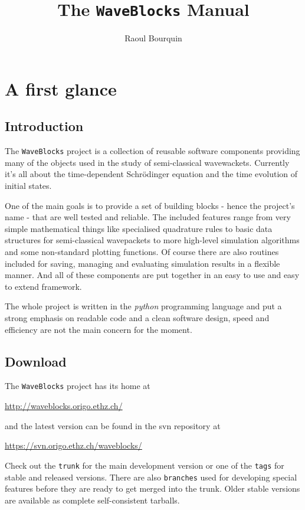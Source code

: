 \documentclass[a4paper,10pt]{report}
\title{The \texttt{WaveBlocks} Manual}
\author{Raoul Bourquin}
\begin{document}
\maketitle


\tableofcontents

\chapter{A first glance}

\section{Introduction}

The \texttt{WaveBlocks} project is a collection of reusable software components
providing many of the objects used in the study of semi-classical wavewackets.
Currently it's all about the time-dependent Schrödinger equation and the time
evolution of initial states.

One of the main goals is to provide a set of building blocks - hence the project's
name - that are well tested and reliable. The included features range from very
simple mathematical things like specialised quadrature rules to basic data
structures for semi-classical wavepackets to more high-level simulation algorithms
and some non-standard plotting functions. Of course there are also routines
included for saving, managing and evaluating simulation results in a flexible
manner. And all of these components are put together in an easy to use and easy
to extend framework.

The whole project is written in the \emph{python} programming language and put
a strong emphasis on readable code and a clean software design, speed and
efficiency are not the main concern for the moment.

\section{Download}

The \texttt{WaveBlocks} project has its home at
\begin{center}
  \url{http://waveblocks.origo.ethz.ch/}
\end{center}
and the latest version can be found in the svn repository at
\begin{center}
  \url{https://svn.origo.ethz.ch/waveblocks/}
\end{center}
Check out the \texttt{trunk} for the main development version or
one of the \texttt{tags} for stable and released versions. There
are also \texttt{branches} used for developing special features
before they are ready to get merged into the trunk. Older stable
versions are available as complete self-consistent tarballs.
\end{document}
